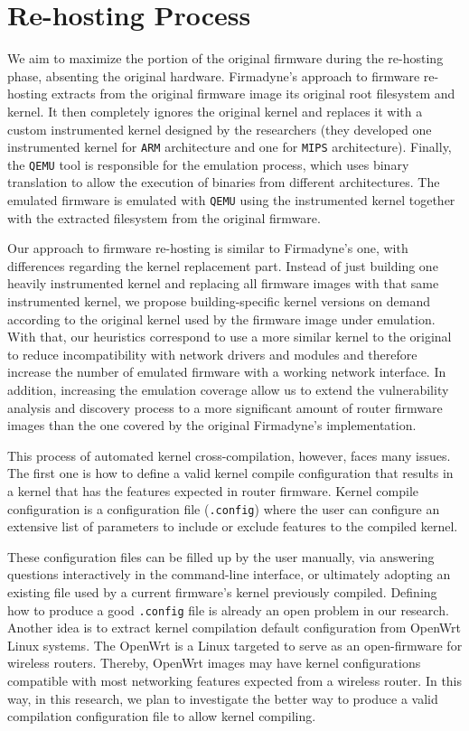 \section{Re-hosting Process}
\label{sec:re-hosting}

We aim to maximize the portion of the original firmware during the re-hosting phase, absenting the original hardware. Firmadyne's approach to firmware re-hosting extracts from the original firmware image its original root filesystem and kernel. It then completely ignores the original kernel and replaces it with a custom instrumented kernel designed by the researchers (they developed one instrumented kernel for {\tt ARM} architecture and one for {\tt MIPS} architecture). Finally, the {\tt QEMU} tool is responsible for the emulation process, which uses binary translation to allow the execution of binaries from different architectures. The emulated firmware is emulated with {\tt QEMU} using the instrumented kernel together with the extracted filesystem from the original firmware.

Our approach to firmware re-hosting is similar to Firmadyne's one, with differences regarding the kernel replacement part. Instead of just building one heavily instrumented kernel and replacing all firmware images with that same instrumented kernel, we propose building-specific kernel versions on demand according to the original kernel used by the firmware image under emulation. With that, our heuristics correspond to use a more similar kernel to the original to reduce incompatibility with network drivers and modules and therefore increase the number of emulated firmware with a working network interface. In addition, increasing the emulation coverage allow us to extend the vulnerability analysis and discovery process to a more significant amount of router firmware images than the one covered by the original Firmadyne's implementation.

This process of automated kernel cross-compilation, however, faces many issues. The first one is how to define a valid kernel compile configuration that results in a kernel that has the features expected in router firmware. Kernel compile configuration is a configuration file ({\tt .config}) where the user can configure an extensive list of parameters to include or exclude features to the compiled kernel.

These configuration files can be filled up by the user manually, via answering questions interactively in the command-line interface, or ultimately adopting an existing file used by a current firmware's kernel previously compiled. Defining how to produce a good {\tt .config} file is already an open problem in our research. Another idea is to extract kernel compilation default configuration from OpenWrt Linux systems. The OpenWrt is a Linux targeted to serve as an open-firmware for wireless routers. Thereby, OpenWrt images may have kernel configurations compatible with most networking features expected from a wireless router. In this way, in this research, we plan to investigate the better way to produce a valid compilation configuration file to allow kernel compiling.

